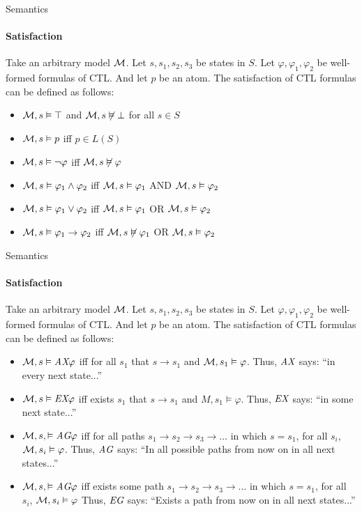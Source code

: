 \begin{frame}{Semantics}
	\framesubtitle{Satisfaction}
	Take an arbitrary model $\mathcal{M}$. Let $s, s_1, s_2, s_3$ be states in $S$. Let $\varphi, \varphi_1, \varphi_2$ be well-formed formulas of CTL. And let $p$ be an atom. The satisfaction of CTL formulas can be defined as follows:
	\begin{itemize}
		\item $\mathcal{M},s \vDash \top$ and $\mathcal{M},s \not\vDash \bot$ for all $s \in S$ \pause
		\item $\mathcal{M},s \vDash p$ iff $p \in L(S)$ \pause
		\item $\mathcal{M},s \vDash \neg\varphi$ iff $\mathcal{M},s \not\vDash \varphi$ \pause
		\item $\mathcal{M},s \vDash \varphi_1 \land \varphi_2$ iff $\mathcal{M},s \vDash \varphi_1$ AND $\mathcal{M},s \vDash \varphi_2$ \pause
		\item $\mathcal{M},s \vDash \varphi_1 \lor \varphi_2$ iff $\mathcal{M},s \vDash \varphi_1$ OR $\mathcal{M},s \vDash \varphi_2$ \pause
		\item $\mathcal{M},s \vDash \varphi_1 \to \varphi_2$ iff $\mathcal{M},s \not\vDash \varphi_1$ OR $\mathcal{M},s \vDash \varphi_2$
	\end{itemize}
\end{frame}

\begin{frame}{Semantics}
	\framesubtitle{Satisfaction}
	Take an arbitrary model $\mathcal{M}$. Let $s, s_1, s_2, s_3$ be states in $S$. Let $\varphi, \varphi_1, \varphi_2$ be well-formed formulas of CTL. And let $p$ be an atom. The satisfaction of CTL formulas can be defined as follows:
	\begin{itemize}
		\item $\mathcal{M},s \vDash \textit{A}\textit{X} \varphi$ iff for all $s_1$ that $s \to s_1$ and $\mathcal{M},s_1 \vDash \varphi$. Thus, $\textit{A}\textit{X}$ says: ``in every next state...''\pause
		\item $\mathcal{M},s \vDash \textit{E}\textit{X} \varphi$ iff exists $s_1$ that $s \to s_1$ and $M,s_1 \vDash \varphi$. Thus, $\textit{E}\textit{X}$ says: ``in some next state...''\pause
		\item $\mathcal{M},s, \vDash \textit{A}\textit{G} \varphi$ iff for all paths $s_1 \to s_2 \to s_3 \to ...$ in which $s = s_1$, for all $s_i$, $\mathcal{M}, s_i \vDash \varphi$. Thus, $\textit{A}\textit{G}$ says: ``In all possible paths from now on in all next states...''\pause
		\item $\mathcal{M},s, \vDash \textit{A}\textit{G} \varphi$ iff exists some path $s_1 \to s_2 \to s_3 \to ...$ in which $s = s_1$, for all $s_i$, $\mathcal{M}, s_i \vDash \varphi$ Thus, $\textit{E}\textit{G}$ says: ``Exists a path from now on in all next states...''
	\end{itemize}
\end{frame}


